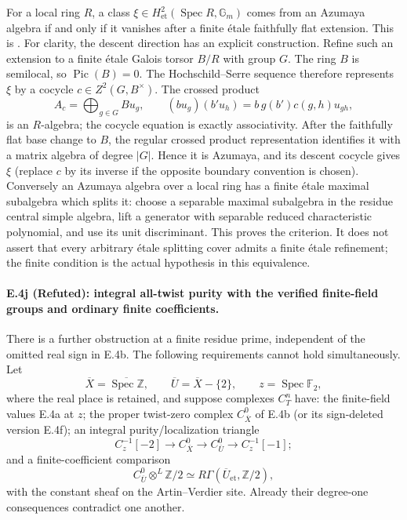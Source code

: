 For a local ring $R$, a class
$\xi\in H^2_{\mathrm{et}}(\operatorname{Spec}R,\mathbb G_m)$
comes from an Azumaya algebra if and only if it vanishes after a finite
\'etale faithfully flat extension. This is
\citet[Proposition 2.4, p.~298]{D_Grothendieck1966BrauerII}.
For clarity, the descent direction has an explicit construction.
Refine such an extension to a finite \'etale Galois torsor $B/R$ with
group $G$. The ring $B$ is semilocal, so $\operatorname{Pic}(B)=0$.
The Hochschild--Serre sequence therefore represents $\xi$ by a cocycle
$c\in Z^2(G,B^\times)$. The crossed product
\[
 A_c=\bigoplus_{g\in G}B u_g,
 \qquad (b u_g)(b'u_h)=b\,g(b')c(g,h)u_{gh},
\]
is an $R$-algebra; the cocycle equation is exactly associativity.
After the faithfully flat base change to $B$, the regular crossed
product representation identifies it with a matrix algebra of degree
$|G|$. Hence it is Azumaya, and its descent cocycle gives $\xi$
(replace $c$ by its inverse if the opposite boundary convention is
chosen). Conversely an Azumaya algebra over a local ring has a finite
\'etale maximal subalgebra which splits it: choose a separable maximal
subalgebra in the residue central simple algebra, lift a generator
with separable reduced characteristic polynomial, and use its unit
discriminant. This proves the criterion. It does not assert that every
arbitrary \'etale splitting cover admits a finite \'etale refinement;
the finite condition is the actual hypothesis in this equivalence.

\paragraph{E.4j (Refuted): integral all-twist purity with the verified finite-field groups and ordinary finite coefficients.}
There is a further obstruction at a finite residue prime, independent
of the omitted real sign in E.4b. The following requirements
cannot hold simultaneously. Let
\[
 \overline X=\overline{\operatorname{Spec}\mathbb Z},\qquad
 \overline U=\overline X-\{2\},\qquad z=\operatorname{Spec}\mathbb F_2,
\]
where the real place is retained, and suppose complexes $C_T^n$ have:
the finite-field values E.4a at $z$; the proper twist-zero complex
$C_{\overline X}^0$ of E.4b (or its sign-deleted version E.4f);
an integral purity/localization triangle
\[
 C_z^{-1}[-2]\longrightarrow C_{\overline X}^0
       \longrightarrow C_{\overline U}^0\longrightarrow C_z^{-1}[-1];
 \tag{E.4.10}
\]
and a finite-coefficient comparison
\[
 C_{\overline U}^0\otimes^L\mathbb Z/2
   \simeq R\Gamma(\overline U_{\mathrm{et}},\mathbb Z/2),
 \tag{E.4.11}
\]
with the constant sheaf on the Artin--Verdier site. Already their
degree-one consequences contradict one another.

